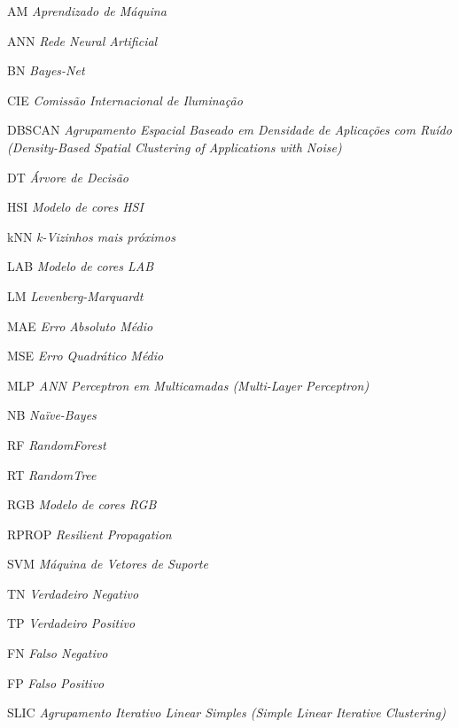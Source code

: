 \blankpage
\begin{siglas}    
    \item[{AM}]     \emph{Aprendizado de Máquina}    
    \item[{ANN}]    \emph{Rede Neural Artificial}
    \item[{BN}]     \emph{Bayes-Net}
    \item[{CIE}]    \emph{Comissão Internacional de Iluminação}
    \item[{DBSCAN}] \emph{Agrupamento Espacial Baseado em Densidade de Aplicações com Ruído (Density-Based Spatial Clustering of Applications with Noise)}
    \item[{DT}]     \emph{Árvore de Decisão}
    \item[{HSI}]    \emph{Modelo de cores HSI}
    \item[{kNN}]    \emph{k-Vizinhos mais próximos}
    \item[{LAB}]    \emph{Modelo de cores LAB}
    \item[{LM}]     \emph{Levenberg-Marquardt}
    \item[{MAE}]    \emph{Erro Absoluto Médio}
    \item[{MSE}]    \emph{Erro Quadrático Médio}
    \item[{MLP}]    \emph{ANN Perceptron em Multicamadas (Multi-Layer Perceptron)}
    \item[{NB}]     \emph{Na\"{i}ve-Bayes}
    \item[{RF}]     \emph{RandomForest}
    \item[{RT}]     \emph{RandomTree}
    \item[{RGB}]    \emph{Modelo de cores RGB}
    \item[{RPROP}]  \emph{Resilient Propagation}
    \item[{SVM}]    \emph{Máquina de Vetores de Suporte}
    \item[TN]       \emph{Verdadeiro Negativo}
    \item[TP]       \emph{Verdadeiro Positivo}
    \item[FN]       \emph{Falso Negativo}
    \item[FP]       \emph{Falso Positivo}
    \item[{SLIC}]   \emph{Agrupamento Iterativo Linear Simples (Simple Linear Iterative Clustering)}
\end{siglas}
